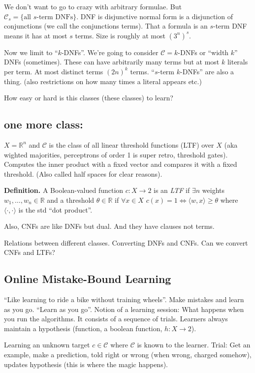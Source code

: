 \documentclass[10pt]{article}
\newcommand{\R}{\mathbb{R}}
\newcommand{\A}{\forall}
\newcommand{\mcC}{\mathcal{C}}
\newcommand{\E}{\exists}
\begin{document}
We don't want to go to crazy with arbitrary formulae. But \(\mcC_s = \{\text{all } s\text{-term DNFs}\}\). 
DNF is disjunctive normal form is a disjunction of conjunctions (we call the conjunctions terms). 
That a formula is an \(s\)-term DNF means it has at most \(s\) terms.  Size is roughly at most \((3^n)^s\).

Now we limit to ``\(k\)-DNFs''. We're going to consider \(\mcC = k\)-DNFs or ``width \(k\)'' DNFs (sometimes). These can have arbitrarily many terms but at most \(k\) literals per term. 
At most distinct terms \((2n)^k\) terms. ``\(s\)-term \(k\)-DNFs'' are also a thing. (also restrictions on how many times a literal appears etc.)

How easy or hard is this classes (these classes) to learn?

\subsection{one more class:}
\(X = \R^n\) and \(\mcC\) is the class of all linear threshold functions (LTF) over \(X\) (aka wighted majorities, perceptrons of order 1 is super retro, threshold gates). 
Computes the inner product with a fixed vector and compares it with a fixed threshold. (Also called half spaces for clear reasons). 

\textbf{Definition.}
A Boolean-valued function \(c:X \to 2\) is an \emph{LTF} if \(\E n\) weights \(w_1, \ldots, w_n \in \R\) and a threshold \(\theta\in\R\) if \(\A x \in X\) \(c(x) =1 \iff \langle w, x\rangle \geq \theta\) where \(\langle\cdot, \cdot\rangle\) is the std ``dot product''.

Also, CNFs are like DNFs but dual. And they have clauses not terms. 

Relations between different classes. Converting DNFs and CNFs. Can we convert CNFs and LTFs?

\subsection{Online Mistake-Bound Learning}
``Like learning to ride a bike without training wheels''. Make mistakes and learn as you go. 
``Learn as you go''.
Notion of a learning session: What happens when you run the algorithms. It consists of a sequence of trials. 
Learners always maintain a hypothesis (function, a boolean function, \(h: X \to 2\)). 

Learning an unknown target \(c \in \mcC\) where \(\mcC\) is known to the learner. 
Trial: Get an example, make a prediction, told right or wrong (when wrong, charged somehow), updates hypothesis (this is where the magic happens). 
\end{document}
